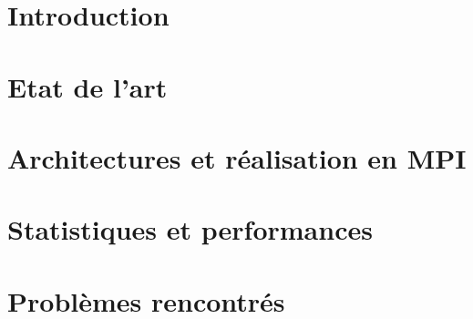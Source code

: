 \documentclass[14pt,a4paper,titlepage]{report}
\begin{document}

\renewcommand\headrulewidth{2pt}

\newpage
\pagestyle{empty}
\tableofcontents

\newpage
\chapter{Introduction}
\thispagestyle{fancy}



\chapter{Etat de l'art}
\thispagestyle{fancy}



\chapter{Architectures et réalisation en MPI}
\thispagestyle{fancy}


\chapter{Statistiques et performances}
\thispagestyle{fancy}



\chapter{Problèmes rencontrés }
\thispagestyle{fancy}

\end{document}
